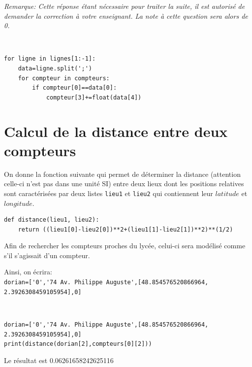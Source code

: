 \textit{Remarque: Cette réponse étant nécessaire pour traiter la suite, il est autorisé de demander la correction à votre enseignant. La note à cette question sera alors de 0.}

\begin{solution}~\ \\
\begin{verbatim}
for ligne in lignes[1:-1]:
    data=ligne.split(';')
    for compteur in compteurs:
        if compteur[0]==data[0]:
            compteur[3]+=float(data[4])
\end{verbatim}
\end{solution}

\section{Calcul de la distance entre deux compteurs}

On donne la fonction suivante qui permet de déterminer la distance (attention celle-ci n'est pas dans une unité SI) entre deux lieux dont les positions relatives sont caractérisées par deux listes \verb?lieu1? et \verb?lieu2? qui contiennent leur $latitude$ et $longitude$.

\begin{verbatim}
def distance(lieu1, lieu2):
    return ((lieu1[0]-lieu2[0])**2+(lieu1[1]-lieu2[1])**2)**(1/2)
\end{verbatim}

Afin de rechercher les compteurs proches du lycée, celui-ci sera modélisé comme s'il s'agissait d'un compteur.

Ainsi, on écrira: \\ \verb?dorian=['0','74 Av. Philippe Auguste',[48.854576520866964, 2.3926308459105954],0]?


\begin{solution}~\ \\
\begin{verbatim}
dorian=['0','74 Av. Philippe Auguste',[48.854576520866964, 2.3926308459105954],0]
print(distance(dorian[2],compteurs[0][2]))
\end{verbatim}
Le résultat est 0.06261658242625116
\end{solution}


